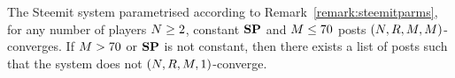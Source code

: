 \begin{corollary}
  \label{corollary:convergence:steem}
  The Steemit system parametrised according to Remark~\ref{remark:steemitparms},
  for any number of players $N \geq 2$, constant $\mathrm{\textbf{SP}}$ and
  $M \leq 70$ posts $\left(N, R, M,
  M\right)$-converges. If $M > 70$ or $\mathrm{\textbf{SP}}$ is not constant,
  then there exists a list of posts such that the system does not
  $\left(N, R, M, 1\right)$-converge.
\end{corollary}
